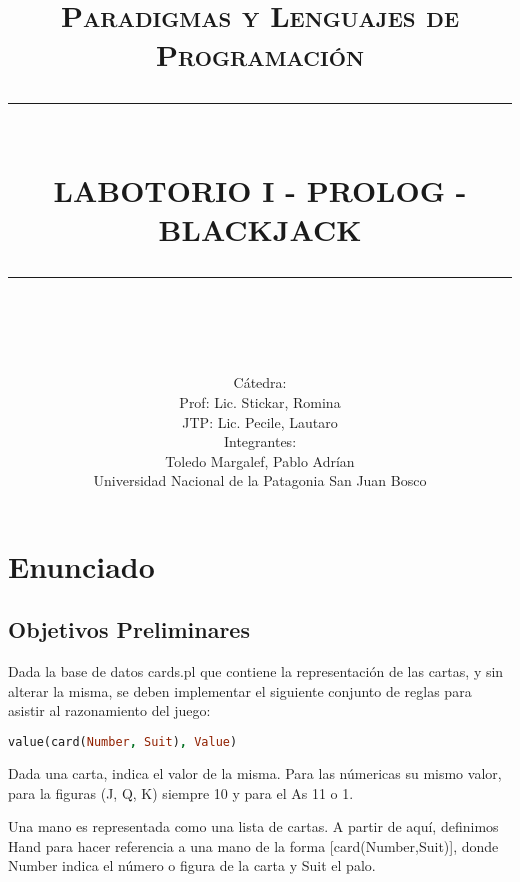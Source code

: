 \documentclass[12pt]{report}
\newcommand{\HRule}[1]{\rule{\linewidth}{#1}}
\begin{document}
\title{ \normalsize \textsc{Paradigmas y Lenguajes de Programación}
    \\ [2.0cm]
    \HRule{0.5pt} \\
    \LARGE \textbf{\uppercase{Labotorio I - Prolog - blackjack}}
\HRule{2pt} \\ [0.5cm]}


\author{
    Cátedra: \\
    Prof: Lic. Stickar, Romina\\
    JTP: Lic. Pecile, Lautaro\\
    Integrantes: \\
    Toledo Margalef, Pablo Adrían \\ 
Universidad Nacional de la Patagonia San Juan Bosco}

\maketitle
\newpage

\sectionfont{\scshape}


\section*{Enunciado}

\subsection*{Objetivos Preliminares}

Dada la base de datos cards.pl que contiene la representación de las cartas, y sin alterar la misma, se deben implementar el siguiente conjunto de reglas para asistir al razonamiento del juego: 

\begin{lstlisting}[language=Prolog]
value(card(Number, Suit), Value)
\end{lstlisting}

Dada una carta, indica el valor de la misma. Para las númericas su mismo valor, para la figuras (J, Q, K) siempre 10 y para el As 11 o 1.

Una mano es representada como una lista de cartas. A partir de aquí, definimos Hand para hacer referencia a una mano de la forma [card(Number,Suit)], donde Number indica el número o figura de la carta y Suit el palo.  
\end{document}
